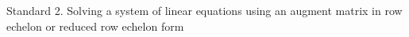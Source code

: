 Standard 2.	Solving a system of linear equations using an augment matrix in row echelon or reduced row echelon form

\ifprintanswers
\else %
 \newpage
\fi

\begin{solution}
   
\end{solution}
